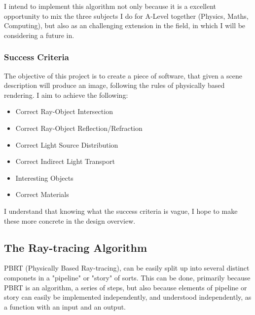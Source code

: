 \documentclass[../main.tex]{subfiles}
\begin{document}
I intend to implement this algorithm not only because it is a excellent opportunity to mix the three subjects I do for A-Level together (Physics, Maths, Computing), but also as an challenging extension in the field, in which I will be considering a future in.
\subsubsection{Success Criteria}
The objective of this project is to create a piece of software, that given a scene description will produce an image, following the rules of physically based rendering. 
I aim to achieve the following:
\begin{itemize}
  \item Correct Ray-Object Intersection
  \item Correct Ray-Object Reflection/Refraction
  \item Correct Light Source Distribution
  \item Correct Indirect Light Transport
  \item Interesting Objects
  \item Correct Materials 
\end{itemize}
I understand that knowing what the success criteria is vague, I hope to make these more concrete in the design overview. 
\subsection{The Ray-tracing Algorithm}
PBRT (Physically Based Ray-tracing), can be easily split up into several distinct componets in a "pipeline" or "story" of sorts. This can be done, primarily because PBRT is an algorithm, a series of steps, but also because elements of pipeline or story can easily be implemented independently, and understood independently, as a function with an input and an output.
\end{document}

